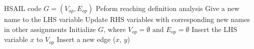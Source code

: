 \documentclass[12pt]{article}
\begin{document}
\begin{CJK}{UTF8}{bkai}
\begin{itemize}
\begin{algorithm}[h!]
        \begin{algorithmic}[1]
            \Require    HSAIL code
            \Ensure     $G = ( V_{op} , E_{op} )$   
            \State      Peform reaching definition analysis     \label{line:rda}
                 \label{line:forhsails}
                \State      Give a new name to the LHS variable
                \State      Update RHS variables with corresponding new names in other assignments
                \EndFor                                                     \label{line:forhsaile}
            \State      Initialize $G \textrm{, where } V_{op} = \emptyset \textrm{ and } E_{op} = \emptyset $
             \label{line:forssas}    
                \State      Insert the LHS variable $x$ to $V_{op}$
                    \State      Insert a new edge ($x$, $y$)
                \EndFor
            \EndFor                                                         \label{line:forssae}
        \end{algorithmic}
        \label{alg:2dfg}
        \end{algorithm}


\end{itemize}
\end{CJK}
\end{document}
